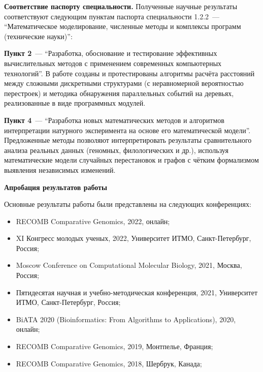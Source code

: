 \textbf{Соответствие паспорту специальности.}
Полученные научные результаты соответствуют следующим пунктам паспорта специальности 1.2.2~--- ``Математическое моделирование, численные методы и комплексы программ (технические науки)'':

 \textbf{Пункт 2}~--- ``Разработка, обоснование и тестирование эффективных вычислительных методов с применением современных компьютерных технологий''.
В работе созданы и протестированы алгоритмы расчёта расстояний между сложными дискретными структурами (с неравномерной вероятностью перестроек) и методика обнаружения параллельных событий на деревьях, реализованные в виде программных модулей.

\textbf{Пункт 4}~--- ``Разработка новых математических методов и алгоритмов интерпретации натурного эксперимента на основе его математической модели''.  
Предложенные методы позволяют интерпретировать результаты сравнительного анализа реальных данных (геномных, филологических и др.), используя математические модели случайных перестановок и графов с чётким формализмом выявления независимых изменений.

\textbf{Апробация результатов работы}

Основные результаты работы были представлены на следующих  конференциях:

\begin{itemize}
    \item RECOMB Comparative Genomics, 2022, онлайн;
    \item XI Конгресс молодых ученых, 2022, Университет ИТМО, Санкт-Петербург, Россия;
    \item Moscow Conference on Computational Molecular Biology, 2021, Москва, Россия;
    \item Пятидесятая научная и учебно-методическая конференция, 2021, Университет ИТМО, Санкт-Петербург, Россия;
    \item BiATA 2020 (Bioinformatics: From Algorithms to Applications), 2020, онлайн;
    \item RECOMB Comparative Genomics, 2019, Монтпелье, Франция;
    \item RECOMB Comparative Genomics, 2018, Шербрук, Канада;
\end{itemize}